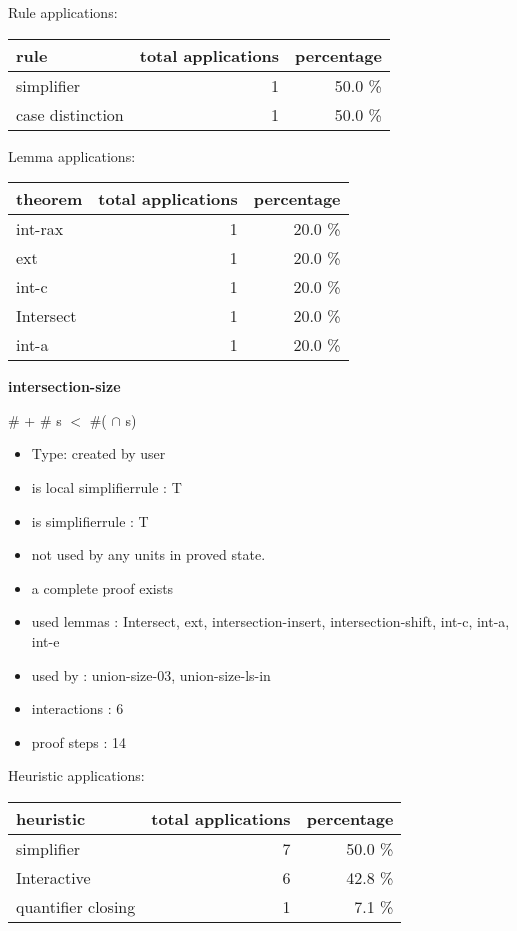 \documentclass[a4paper]{article}
\begin{document}
Rule applications:

\begin{supertabular}{l|r|r}
rule	        & total applications & percentage \\ \hline
simplifier & 1 & 50.0 \% \\
case distinction & 1 & 50.0 \% \\

\end{supertabular}

Lemma applications:

\begin{supertabular}{l|r|r}
theorem	        & total applications & percentage \\ \hline
int-rax & 1 & 20.0 \% \\
ext & 1 & 20.0 \% \\
int-c & 1 & 20.0 \% \\
Intersect & 1 & 20.0 \% \\
int-a & 1 & 20.0 \% \\

\end{supertabular}
\pagebreak

{\LARGE\bf intersection-size}\label{lemma-intersection-size}

\medskip

 \Fol \Not \#  + \# s $<$ \#( $\cap$ s)

\begin{itemize}

\item Type: created by user

\item is local simplifierrule : T
\item is simplifierrule : T
\item not used by any units in proved state.
\item       a complete proof exists
\item       used lemmas  : Intersect, ext, intersection-insert, intersection-shift, int-c, int-a, int-e
\item       used by      : union-size-03, union-size-ls-in
\item       interactions : 6
\item       proof steps  : 14
\end{itemize}

\medskip


Heuristic applications:

\begin{supertabular}{l|r|r}
heuristic	& total applications & percentage \\ \hline
simplifier & 7 & 50.0 \% \\
Interactive & 6 & 42.8 \% \\
quantifier closing & 1 & 7.1 \% \\

\end{supertabular}
\end{document}
